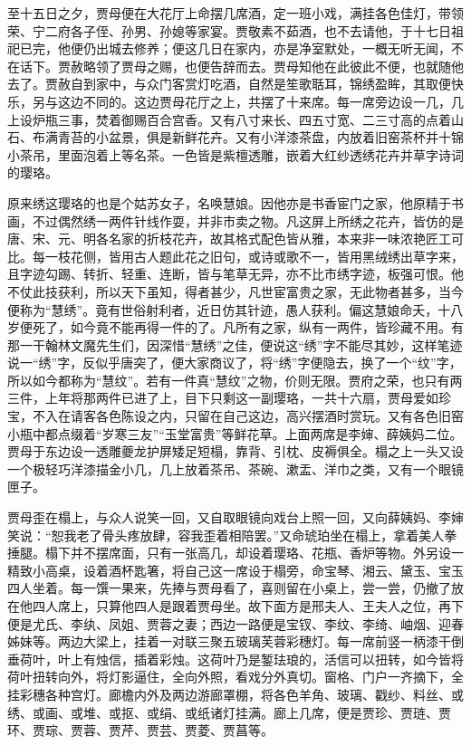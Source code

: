 \documentclass[12pt,oneside]{book}
\begin{document}
至十五日之夕，贾母便在大花厅上命摆几席酒，定一班小戏，满挂各色佳灯，带领荣、宁二府各子侄、孙男、孙媳等家宴。贾敬素不茹酒，也不去请他，于十七日祖祀已完，他便仍出城去修养；便这几日在家内，亦是净室默处，一概无听无闻，不在话下。贾赦略领了贾母之赐，也便告辞而去。贾母知他在此彼此不便，也就随他去了。贾赦自到家中，与众门客赏灯吃酒，自然是笙歌聒耳，锦绣盈眸，其取便快乐，另与这边不同的。这边贾母花厅之上，共摆了十来席。每一席旁边设一几，几上设炉瓶三事，焚着御赐百合宫香。又有八寸来长、四五寸宽、二三寸高的点着山石、布满青苔的小盆景，俱是新鲜花卉。又有小洋漆茶盘，内放着旧窑茶杯并十锦小茶吊，里面泡着上等名茶。一色皆是紫檀透雕，嵌着大红纱透绣花卉并草字诗词的璎珞。

原来绣这璎珞的也是个姑苏女子，名唤慧娘。因他亦是书香宦门之家，他原精于书画，不过偶然绣一两件针线作耍，并非市卖之物。凡这屏上所绣之花卉，皆仿的是唐、宋、元、明各名家的折枝花卉，故其格式配色皆从雅，本来非一味浓艳匠工可比。每一枝花侧，皆用古人题此花之旧句，或诗或歌不一，皆用黑绒绣出草字来，且字迹勾踢、转折、轻重、连断，皆与笔草无异，亦不比市绣字迹，板强可恨。他不仗此技获利，所以天下虽知，得者甚少，凡世宦富贵之家，无此物者甚多，当今便称为“慧绣”。竟有世俗射利者，近日仿其针迹，愚人获利。偏这慧娘命夭，十八岁便死了，如今竟不能再得一件的了。凡所有之家，纵有一两件，皆珍藏不用。有那一干翰林文魔先生们，因深惜“慧绣”之佳，便说这“绣”字不能尽其妙，这样笔迹说一“绣”字，反似乎唐突了，便大家商议了，将“绣”字便隐去，换了一个“纹”字，所以如今都称为“慧纹”。若有一件真“慧纹”之物，价则无限。贾府之荣，也只有两三件，上年将那两件已进了上，目下只剩这一副璎珞，一共十六扇，贾母爱如珍宝，不入在请客各色陈设之内，只留在自己这边，高兴摆酒时赏玩。又有各色旧窑小瓶中都点缀着“岁寒三友”“玉堂富贵”等鲜花草。上面两席是李婶、薛姨妈二位。贾母于东边设一透雕夔龙护屏矮足短榻，靠背、引枕、皮褥俱全。榻之上一头又设一个极轻巧洋漆描金小几，几上放着茶吊、茶碗、漱盂、洋巾之类，又有一个眼镜匣子。

贾母歪在榻上，与众人说笑一回，又自取眼镜向戏台上照一回，又向薛姨妈、李婶笑说：“恕我老了骨头疼放肆，容我歪着相陪罢。”又命琥珀坐在榻上，拿着美人拳捶腿。榻下并不摆席面，只有一张高几，却设着璎珞、花瓶、香炉等物。外另设一精致小高桌，设着酒杯匙箸，将自己这一席设于榻旁，命宝琴、湘云、黛玉、宝玉四人坐着。每一馔一果来，先捧与贾母看了，喜则留在小桌上，尝一尝，仍撤了放在他四人席上，只算他四人是跟着贾母坐。故下面方是邢夫人、王夫人之位，再下便是尤氏、李纨、凤姐、贾蓉之妻；西边一路便是宝钗、李纹、李绮、岫烟、迎春姊妹等。两边大梁上，挂着一对联三聚五玻璃芙蓉彩穗灯。每一席前竖一柄漆干倒垂荷叶，叶上有烛信，插着彩烛。这荷叶乃是錾珐琅的，活信可以扭转，如今皆将荷叶扭转向外，将灯影逼住，全向外照，看戏分外真切。窗格、门户一齐摘下，全挂彩穗各种宫灯。廊檐内外及两边游廊罩棚，将各色羊角、玻璃、戳纱、料丝、或绣、或画、或堆、或抠、或绢、或纸诸灯挂满。廊上几席，便是贾珍、贾琏、贾环、贾琮、贾蓉、贾芹、贾芸、贾菱、贾菖等。
\end{document}
